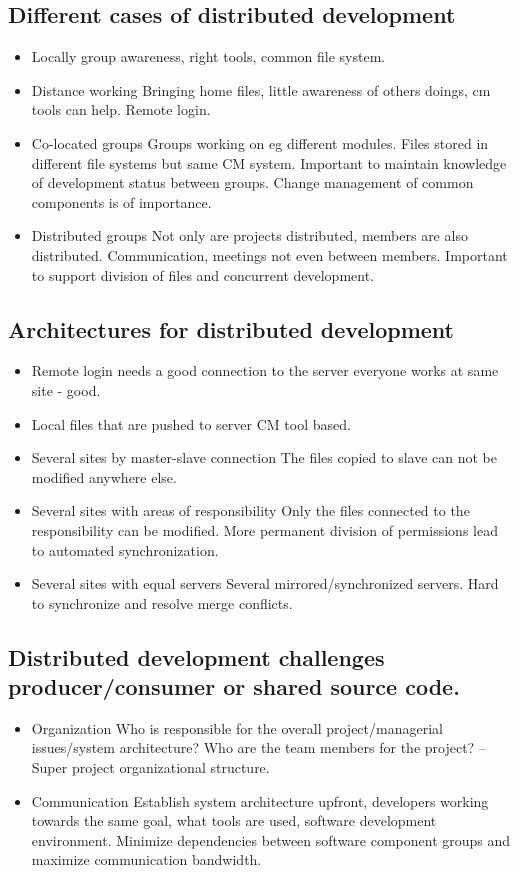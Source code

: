 \documentclass{article}
\begin{document}
\subsection{ Different cases of distributed development}
\begin{itemize}
    \item Locally group awareness, right tools, common file system.
    \item Distance working Bringing home files, little awareness of others doings, cm tools can help. Remote login.
    \item Co-located groups Groups working on eg different modules. Files stored in different file systems but same CM system. Important to maintain knowledge of development status between groups. Change management of common components is of importance.
    \item Distributed groups Not only are projects distributed, members are also distributed. Communication, meetings not even between members. Important to support division of files and concurrent development.
\end{itemize}
\subsection{Architectures for distributed development}
\begin{itemize}
    \item Remote login needs a good connection to the server everyone works at same site - good.
    \item Local files that are pushed to server CM tool based.
    \item Several sites by master-slave connection The files copied to slave can not be modified anywhere else.
    \item Several sites with areas of responsibility Only the files connected to the responsibility can be modified. More permanent division of permissions lead to automated synchronization.
    \item Several sites with equal servers Several mirrored/synchronized servers. Hard to synchronize and resolve merge conflicts.
\end{itemize}


\subsection{Distributed development challenges producer/consumer or shared source code.}
\begin{itemize}
    \item Organization Who is responsible for the overall project/managerial issues/system architecture? Who are the team members for the project? -- Super project organizational structure.
    \item Communication Establish system architecture upfront, developers working towards the same goal, what tools are used, software development environment. Minimize dependencies between software component groups and maximize communication bandwidth.
\end{itemize}
\end{document}
